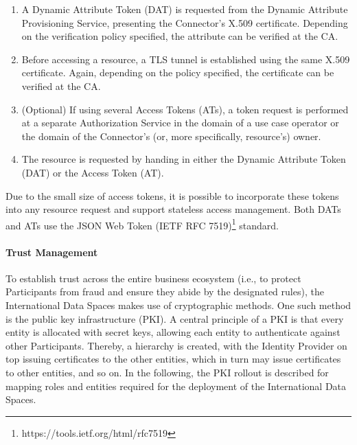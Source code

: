 \begin{enumerate}[label*=\arabic*.]
	\item A Dynamic Attribute Token (DAT) is requested from the Dynamic Attribute Provisioning Service, presenting the Connector's X.509 certificate. Depending on the verification policy specified, the attribute can be verified at the CA.

	\item Before accessing a resource, a TLS tunnel is established using the same X.509 certificate. Again, depending on the policy specified, the certificate can be verified at the CA.

	\item (Optional) If using several Access Tokens (ATs), a token request is performed at a separate Authorization Service in the domain of a use case operator or the domain of the Connector's (or, more specifically, resource’s) owner.

	\item The resource is requested by handing in either the Dynamic Attribute Token (DAT) or the Access Token (AT).
\end{enumerate}

Due to the small size of access tokens, it is possible to incorporate these tokens into any resource request and support stateless access management. Both DATs and ATs use the JSON Web Token (IETF RFC 7519)\footnote{ https://tools.ietf.org/html/rfc7519 } standard.

\paragraph*{Trust Management \\}
To establish trust across the entire business ecosystem (i.e., to protect Participants from fraud and ensure they abide by the designated rules), the International Data Spaces makes use of cryptographic methods. One such method is the public key infrastructure (PKI). A central principle of a PKI is that every entity is allocated with secret keys, allowing each entity to authenticate against other Participants. Thereby, a hierarchy is created, with the Identity Provider on top issuing certificates to the other entities, which in turn may issue certificates to other entities, and so on. In the following, the PKI rollout is described for mapping roles and entities required for the deployment of the International Data Spaces.



